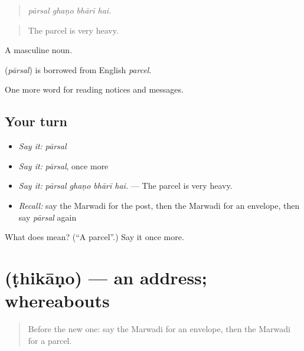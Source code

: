 \begin{quote}
   
\end{quote}

\begin{quote}
\emph{pārsal ghaṇo bhārī hai.}
\end{quote}

\begin{quote}
The parcel is very heavy.
\end{quote}

A masculine noun.

\begin{cousinweb}
\textbf{} (\emph{pārsal}) is borrowed from English \emph{parcel}.
\end{cousinweb}

\begin{grammarlens}[title={What you've built}]
One more word for reading notices and messages.
\end{grammarlens}

\subsection*{Your turn}
\begin{itemize}
\raggedright
  \item \emph{Say it:} \emph{pārsal}
  \item \emph{Say it:} \emph{pārsal}, once more
  \item \emph{Say it:} \emph{pārsal ghaṇo bhārī hai.} — The parcel is very heavy.
  \item \emph{Recall:} say the Marwadi for the post, then the Marwadi for an envelope, then say \emph{pārsal} again
\end{itemize}

\begin{tcolorbox}[breakable,colback=teal!4,colframe=teal!35!black,title={Before you move on}]
What does  mean? (\textquotedblleft{}A parcel\textquotedblright{}.) Say it once more.
\end{tcolorbox}
\section[\texorpdfstring{\mw{ठिकाणो} (ṭhikāṇo)}{ठिकाणो (ṭhikāṇo)}]{ (ṭhikāṇo) — an address; whereabouts}

\label{lesson:MW-C196-thikano}



\begin{quote}
Before the new one: say the Marwadi for an envelope, then the Marwadi for a parcel.
\end{quote}

